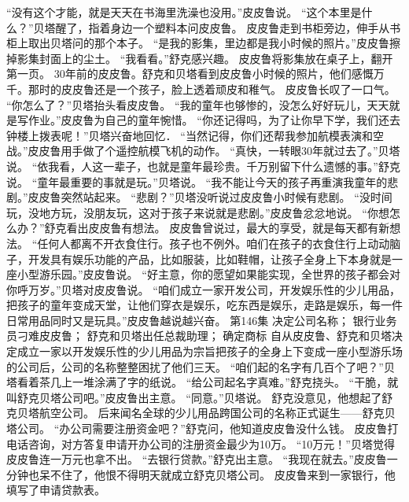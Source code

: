 \documentclass[a4paper,12pt,UTF8,twoside]{ctexbook}
\begin{document}
        “没有这个才能，就是天天在书海里洗澡也没用。”皮皮鲁说。 
        “这个本里是什么？”贝塔醒了，指着身边一个塑料本问皮皮鲁。 
        皮皮鲁走到书柜旁边，伸手从书柜上取出贝塔问的那个本子。 
        “是我的影集，里边都是我小时候的照片。”皮皮鲁擦掉影集封面上的尘土。 
        “我看看。”舒克感兴趣。 
        皮皮鲁将影集放在桌子上，翻开第一页。 
        30年前的皮皮鲁。舒克和贝塔看到皮皮鲁小时候的照片，他们感慨万千。那时的皮皮鲁还是一个孩子，脸上透着顽皮和稚气。 
        皮皮鲁长叹了一口气。 
        “你怎么了？”贝塔抬头看皮皮鲁。 
        “我的童年也够惨的，没怎么好好玩儿，天天就是写作业。”皮皮鲁为自己的童年惋惜。 
        “你还记得吗，为了让你早下学，我们还去钟楼上拨表呢！”贝塔兴奋地回忆． 
        “当然记得，你们还帮我参加航模表演和空战。”皮皮鲁用手做了个遥控航模飞机的动作。 
        “真快，一转眼30年就过去了。”贝塔说。 
        “依我看，人这一辈子，也就是童年最珍贵。千万别留下什么遗憾的事。”舒克说。 
        “童年最重要的事就是玩。”贝塔说。 
        “我不能让今天的孩子再重演我童年的悲剧。”皮皮鲁突然站起来。 
        “悲剧？”贝塔没听说过皮皮鲁小时候有悲剧。 
        “没时间玩，没地方玩，没朋友玩，这对于孩子来说就是悲剧。”皮皮鲁忿忿地说。 
        “你想怎么办？”舒克看出皮皮鲁有想法。 
        皮皮鲁曾说过，最大的享受，就是每天都有新想法。 
        “任何人都离不开衣食住行。孩子也不例外。咱们在孩子的衣食住行上动动脑子，开发具有娱乐功能的产品，比如服装，比如鞋帽，让孩子全身上下本身就是一座小型游乐园。”皮皮鲁说。 
        “好主意，你的愿望如果能实现，全世界的孩子都会对你呼万岁。”贝塔对皮皮鲁说。 
        “咱们成立一家开发公司，开发娱乐性的少儿用品，把孩子的童年变成天堂，让他们穿衣是娱乐，吃东西是娱乐，走路是娱乐，每一件日常用品同时又是玩具。”皮皮鲁越说越兴奋。   第146集 
        决定公司名称； 
        银行业务员刁难皮皮鲁； 
        舒克和贝塔出任总裁助理； 
        确定商标   
        自从皮皮鲁、舒克和贝塔决定成立一家以开发娱乐性的少儿用品为宗旨把孩子的全身上下变成一座小型游乐场的公司后，公司的名称整整困扰了他们三天。 
        “咱们起的名字有几百个了吧？”贝塔看着茶几上一堆涂满了字的纸说。 
        “给公司起名字真难。”舒克挠头。 
        “干脆，就叫舒克贝塔公司吧。”皮皮鲁出主意。 
        “同意。”贝塔说。 
        舒克没意见，他想起了舒克贝塔航空公司。 
        后来闻名全球的少儿用品跨国公司的名称正式诞生——舒克贝塔公司。 
        “办公司需要注册资金吧？”舒克问，他知道皮皮鲁没什么钱。 
        皮皮鲁打电话咨询，对方答复申请开办公司的注册资金最少为10万。 
        “10万元！”贝塔觉得皮皮鲁连一万元也拿不出。 
        “去银行贷款。”舒克出主意。 
        “我现在就去。”皮皮鲁一分钟也呆不住了，他恨不得明天就成立舒克贝塔公司。 
        皮皮鲁来到一家银行，他填写了申请贷款表。 
\end{document}
